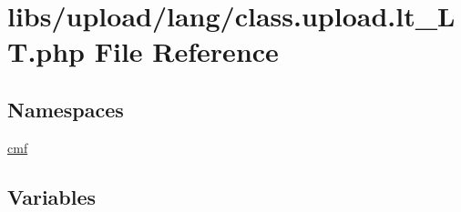 \hypertarget{class_8upload_8lt___l_t_8php}{}\section{libs/upload/lang/class.upload.\+lt\+\_\+\+L\+T.\+php File Reference}
\label{class_8upload_8lt___l_t_8php}
\subsection*{Namespaces}
\begin{DoxyCompactItemize}
\item 
 \hyperlink{namespacecmf}{cmf}
\end{DoxyCompactItemize}
\subsection*{Variables}
